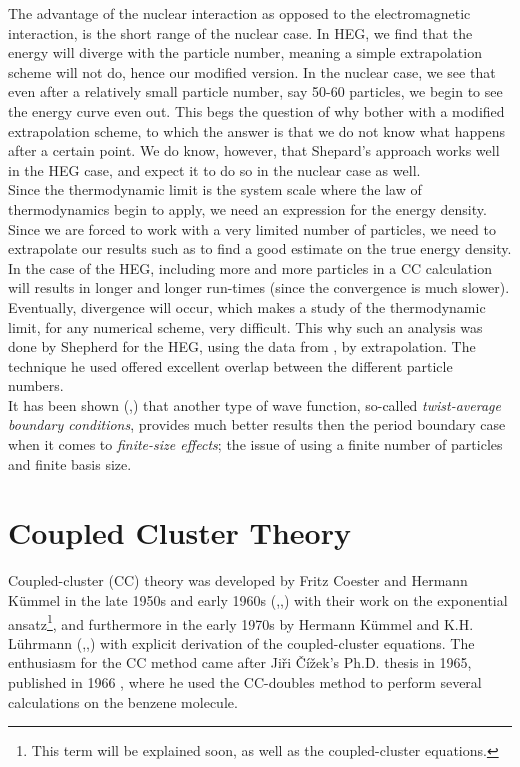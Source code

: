 \documentclass[10pt,twoside]{report}
\begin{document}
	The advantage of the nuclear interaction as opposed to the electromagnetic interaction, is the short range of the nuclear case. In HEG, we find that the energy will diverge with the particle number, meaning a simple extrapolation scheme will not do, hence our modified version. In the nuclear case, we see that even after a relatively small particle number, say 50-60 particles, we begin to see the energy curve even out. This begs the question of why bother with a modified extrapolation scheme, to which the answer is that we do not know what happens after a certain point. We do know, however, that Shepard's approach works well in the HEG case, and expect it to do so in the nuclear case as well.\\
	
	Since the thermodynamic limit is the system scale where the law of thermodynamics begin to apply, we need an expression for the energy density. Since we are forced to work with a very limited number of particles, we need to extrapolate our results such as to find a good estimate on the true energy density. In the case of the HEG, including more and more particles in a CC calculation will results in longer and longer run-times (since the convergence is much slower). Eventually, divergence will occur, which makes a study of the thermodynamic limit, for any numerical scheme, very difficult. This why such an analysis was done by Shepherd \cite{Shepherd16} for the HEG, using the data from \cite{Baardsen14}, by extrapolation. The technique he used offered excellent overlap between the different particle numbers.\\
	
	It has been shown (\cite{HJensenLombardoKolck16},\cite{GHagen14}) that another type of wave function, so-called \emph{twist-average boundary conditions}, provides much better results then the period boundary case when it comes to \emph{finite-size effects}; the issue of using a finite number of particles and finite basis size.
	
	\newpage
	\chapter{Coupled Cluster Theory}
	
	Coupled-cluster (CC) theory was developed by Fritz Coester and Hermann K\"ummel in the late 1950s and early 1960s (\cite{Coester58},\cite{CoesterKummel60},\cite{Kummel62}) with their work on the exponential ansatz\footnote{This term will be explained soon, as well as the coupled-cluster equations.}, and furthermore in the early 1970s by Hermann K\"ummel and K.H. L\"uhrmann (\cite{Kummel71},\cite{KummeLuhrmann72},\cite{KummeLuhrmann72_2}) with explicit derivation of the coupled-cluster equations. The enthusiasm for the CC method came after Ji\v{r}i \v{C}\'{i}\v{z}ek's Ph.D. thesis in 1965, published in 1966 \cite{Cizek66}, where he used the CC-doubles method to perform several calculations on the benzene molecule.\\
	
\end{document}
